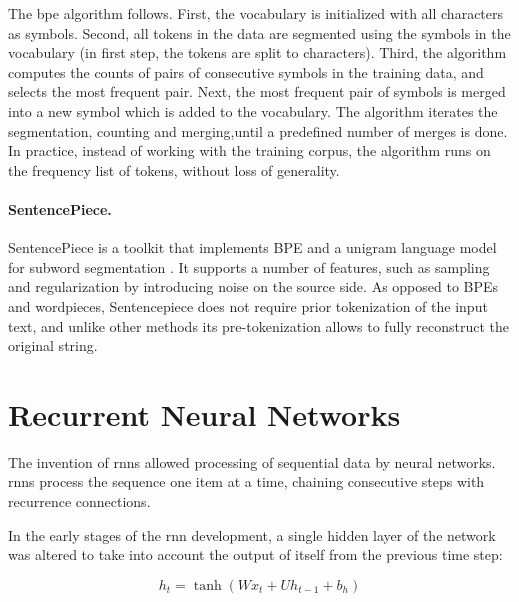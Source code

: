 The \gls{bpe} algorithm %
follows. First, the vocabulary is initialized with all characters as
symbols. Second, all tokens in the data are segmented using the symbols in the
vocabulary (in first step, the tokens are split to characters).  Third, the
algorithm computes the counts of pairs of consecutive symbols in the training
data, and selects the most frequent pair. Next, the most frequent pair of
symbols is merged into a new symbol which is added to the vocabulary. The
algorithm iterates the segmentation, counting and merging,until a predefined
number of merges is done. In practice, instead of working with the training
corpus, the algorithm runs on the frequency list of tokens, without loss of
generality.

\paragraph{SentencePiece.}   SentencePiece
\citep{kudo2018sentencepiece} is a toolkit that implements BPE and a unigram
language model for subword segmentation \citep{kudo-2018-subword}. It supports a
number of features, such as sampling and regularization by introducing noise on
the source side. As opposed to BPEs and wordpieces, Sentencepiece does not
require prior tokenization of the input text, and unlike other methods its
pre-tokenization allows to fully reconstruct the original string.



\section{Recurrent Neural Networks}
\label{sec:rnn}

The invention of \glspl{rnn} \citep{elman1990finding} allowed processing of
sequential data by neural networks. \Glspl{rnn} process the sequence one item at
a time, chaining consecutive steps with recurrence connections.

In the early stages of the \gls{rnn} development, a single hidden layer of the
network was altered to take into account the output of itself from the previous
time step:

%

\begin{equation} h_t = \tanh ( W x_t + U h_{t-1} + b_h ) \label{eq:vanilla-rnn}
\end{equation}

